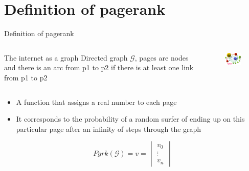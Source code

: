 \documentclass[10pt]{beamer}
\begin{document}
\section{Definition of pagerank}
\begin{frame}{Definition of pagerank}
\begin{columns}
\begin{column}{5cm}
\begin{block}{The internet as a graph}
Directed graph $\mathcal{G}$, pages are nodes and there is an arc from p1 to p2 if there is at least one link from p1 to p2
\end{block}
\end{column}
\begin{column}{5cm}
\begin{figure}[r]
	\includegraphics[width =4.5cm]{PageRank-hi-res.png}
\end{figure}
\end{column}
\end{columns}
\begin{definition}
\begin{itemize}
\item A function that assigns a real number to each page
\item It corresponds to the probability of a random surfer of ending up on this particular page after an infinity of steps through the graph
\end{itemize}
$$Pgrk(\mathcal{G}) = v = \begin{vmatrix}v_0\\
				\vdots \\
				v_n\end{vmatrix} $$
\end{definition}

\end{frame}
\end{document}
